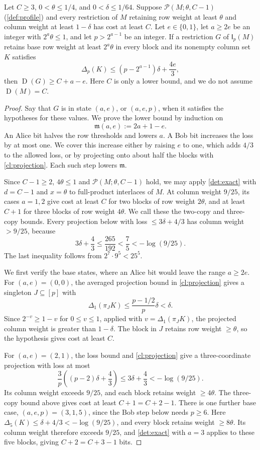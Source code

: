 \documentclass[11pt,letterpaper]{article} \usepackage[utf8]{inputenc}
\theoremstyle{plain} \newtheorem{theorem}{Theorem}[section]
\theoremstyle{definition} \newaliascnt{definition}{theorem}
\newcommand{\D}{\operatorname{D}}
\newcommand{\Int}[2]{\mathsf{I}_{#1}(#2)}
\newcommand{\RP}[3]{\mathcal{P}(#1;#2,#3)}
\begin{document}
\begin{lemma}\label{cl:defect-induction}
Let $C\ge3$, $0<\theta\le1/4$, and $0<\delta\le1/64$.
Suppose $\RP{M}{\theta}{C-1}$ (\cref{def:profile}) and every restriction of $M$ retaining row
weight at least $\theta$ and column weight at least $1-\delta$ has cost at least $C$.
Let $e\in\{0,1\}$, let $a\ge2e$ be an integer with $2^a\theta\le1$, and let
$p>2^{a-1}$ be an integer. If a restriction $G$ of $\Int{p}{M}$ retains base
row weight at least $2^a\theta$ in every block and its nonempty column set $K$ satisfies
\[
\Delta_p(K)\le(p-2^{a-1})\delta+\frac{4e}{3},
\]
then $\D(G)\ge C+a-e$. Here $C$ is only a lower bound, and we do not assume
$\D(M)=C$.
\end{lemma}

\begin{proof}
Say that $G$ is in state $(a,e)$, or $(a,e,p)$, when it satisfies the
hypotheses for these values. We prove the lower bound by induction on
\[
\mathfrak m(a,e):=2a+1-e.
\]
An Alice bit halves the row thresholds and lowers $a$.
A Bob bit increases the loss by at most one. We cover this increase either
by raising $e$ to one, which adds $4/3$ to the allowed loss, or by projecting
onto about half the blocks with \cref{cl:projection}. Each such step lowers $\mathfrak m$.

Since $C-1\ge2$, $4\theta\le1$ and $\RP{M}{\theta}{C-1}$ hold, we may apply
\cref{det:exact} with $d=C-1$ and $x=\theta$ to full-product interlaces of $M$. At column weight $9/25$, its cases $a=1,2$
give cost at least $C$ for two blocks of row weight $2\theta$, and at least
$C+1$ for three blocks of row weight $4\theta$. We call these the two-copy and
three-copy bounds. Every projection below with loss $\le3\delta+4/3$
has column weight $>9/25$, because
\[
3\delta+\frac43\le\frac{265}{192}<\frac75<-\log(9/25).
\]
The last inequality follows from \(2^7\cdot9^5<25^5\).

We first verify the base states, where an Alice bit would leave the range \(a\ge2e\). For \((a,e)=(0,0)\), the averaged
projection bound in \cref{cl:projection} gives a singleton \(J\subseteq[p]\)
with
\[
\Delta_1(\pi_JK)\le\frac{p-1/2}{p}\delta<\delta.
\]
Since \(2^{-v}\ge1-v\) for \(0\le v\le1\), applied with \(v=\Delta_1(\pi_JK)\), the projected column weight is
greater than \(1-\delta\). The block in \(J\) retains row weight
\(\ge\theta\), so the hypothesis gives cost at least \(C\).

For \((a,e)=(2,1)\), the loss bound and \cref{cl:projection} give a
three-coordinate projection with loss at most
\[
\frac3p\left((p-2)\delta+\frac43\right)
\le3\delta+\frac43<-\log(9/25).
\]
Its column weight exceeds \(9/25\), and each block retains weight
\(\ge4\theta\). The three-copy bound above gives cost at least
\(C+1=C+2-1\).
There is one further base case, \((a,e,p)=(3,1,5)\), since the Bob step below needs \(p\ge6\). Here \(\Delta_5(K)\le\delta+4/3<-\log(9/25)\), and every block retains weight \(\ge8\theta\).
Its column weight therefore exceeds \(9/25\), and \cref{det:exact} with $a=3$
applies to these five blocks, giving $C+2=C+3-1$ bits.


\end{proof}
\end{document}
